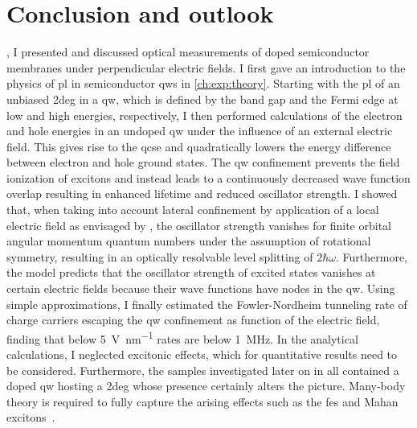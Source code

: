 \chapter{Conclusion and outlook}\label{ch:exp:conclusion}
 \thispart, I presented and discussed optical measurements of doped semiconductor membranes under perpendicular electric fields.
I first gave an introduction to the physics of \acrfull{pl} in semiconductor \glspl{qw} in \cref{ch:exp:theory}.
Starting with the \gls{pl} of an unbiased \gls{2deg} in a \gls{qw}, which is defined by the band gap and the Fermi edge at low and high energies, respectively, I then performed calculations of the electron and hole energies in an undoped \gls{qw} under the influence of an external electric field.
This gives rise to the \gls{qcse} and quadratically lowers the energy difference between electron and hole ground states.
The \gls{qw} confinement prevents the field ionization of excitons and instead leads to a continuously decreased wave function overlap resulting in enhanced lifetime and reduced oscillator strength.
I showed that, when taking into account lateral confinement by application of a local electric field as envisaged by \citet{Descamps2021}, the oscillator strength vanishes for finite orbital angular momentum quantum numbers under the assumption of rotational symmetry, resulting in an optically resolvable level splitting of $2\hbar\omega$.
Furthermore, the model predicts that the oscillator strength of excited states vanishes at certain electric fields because their wave functions have nodes in the \gls{qw}.
Using simple approximations, I finally estimated the Fowler-Nordheim tunneling rate of charge carriers escaping the \gls{qw} confinement as function of the electric field, finding that below \qty{5}{\volt\per\nano\meter} rates are below \qty{1}{\mega\hertz}.
In the analytical calculations, I neglected excitonic effects, which for quantitative results need to be considered.
Furthermore, the samples investigated later on in \thispart all contained a doped \gls{qw} hosting a \gls{2deg} whose presence certainly alters the picture.
Many-body theory is required to fully capture the arising effects such as the \gls{fes} and Mahan excitons~\cite{Mahan1967a}.

